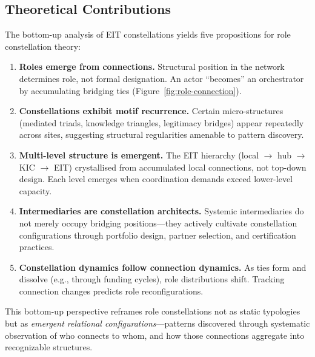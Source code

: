\subsection{Theoretical Contributions}

The bottom-up analysis of EIT constellations yields five propositions for role constellation theory:

\begin{enumerate}[noitemsep,topsep=2pt]
    \item \textbf{Roles emerge from connections.} Structural position in the network determines role, not formal designation. An actor ``becomes'' an orchestrator by accumulating bridging ties (Figure~\ref{fig:role-connection}).
    
    \item \textbf{Constellations exhibit motif recurrence.} Certain micro-structures (mediated triads, knowledge triangles, legitimacy bridges) appear repeatedly across sites, suggesting structural regularities amenable to pattern discovery.
    
    \item \textbf{Multi-level structure is emergent.} The EIT hierarchy (local $\rightarrow$ hub $\rightarrow$ KIC $\rightarrow$ EIT) crystallised from accumulated local connections, not top-down design. Each level emerges when coordination demands exceed lower-level capacity.
    
    \item \textbf{Intermediaries are constellation architects.} Systemic intermediaries do not merely occupy bridging positions---they actively cultivate constellation configurations through portfolio design, partner selection, and certification practices.
    
    \item \textbf{Constellation dynamics follow connection dynamics.} As ties form and dissolve (e.g., through funding cycles), role distributions shift. Tracking connection changes predicts role reconfigurations.
\end{enumerate}

This bottom-up perspective reframes role constellations not as static typologies but as \textit{emergent relational configurations}---patterns discovered through systematic observation of who connects to whom, and how those connections aggregate into recognizable structures.
